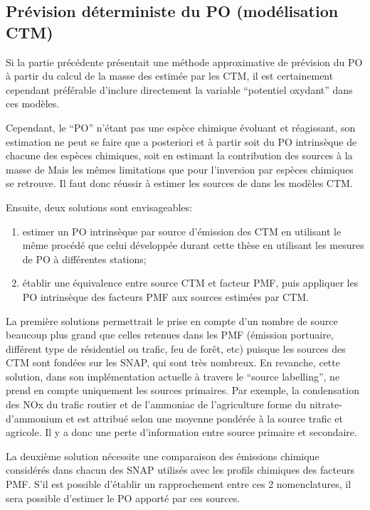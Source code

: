 \subsection{Prévision déterministe du PO (modélisation CTM)}

Si la partie précédente présentait une méthode approximative de prévision du PO à partir
du calcul de la masse des \PMdix{} estimée par les CTM, il est certainement cependant
préférable d'inclure directement la variable ``potentiel oxydant'' dans ces modèles.

Cependant, le ``PO'' n'étant pas une espèce chimique évoluant et réagissant, son
estimation ne peut se faire que a posteriori et à partir soit du PO intrinsèque de chacune
des espèces chimiques, soit en estimant la contribution des sources à la masse de \PMdix
Mais les mêmes limitations que pour l'inversion par espèces chimiques se retrouve. Il faut donc
réussir à estimer les sources de \PMdix{} dans les modèles CTM.

Ensuite, deux solutions sont envisageables:
\begin{enumerate}
    \item estimer un PO intrinsèque par source d'émission des CTM en utilisant le même
        procédé que celui développée durant cette thèse en utilisant les mesures de PO à
        différentes stations;
    \item établir une équivalence entre source CTM et facteur PMF, puis appliquer les
        PO intrinsèque des facteurs PMF aux sources estimées par CTM.
\end{enumerate}

La première solutions permettrait le prise en compte d'un nombre de source beaucoup plus
grand que celles retenues dans les PMF (émission portuaire, différent type de résidentiel
ou trafic, feu de forêt, etc) puisque les sources des CTM sont fondées sur les SNAP, qui
sont très nombreux.
En revanche, cette solution, dans son implémentation actuelle à travers le ``source
labelling'', ne prend en compte uniquement les sources primaires. Par exemple, la
condensation des NOx du trafic routier et de l'ammoniac de l'agriculture forme du
nitrate-d'ammonium et est attribué selon une moyenne pondérée à la source trafic et
agricole. Il y a donc une perte d'information entre source primaire et secondaire.

La deuxième solution nécessite une comparaison des émissions chimique considérés dans
chacun des SNAP utilisés avec les profils chimiques des facteurs PMF. S'il est possible
d'établir un rapprochement entre ces 2 nomenclatures, il sera possible d'estimer le PO
apporté par ces sources.

